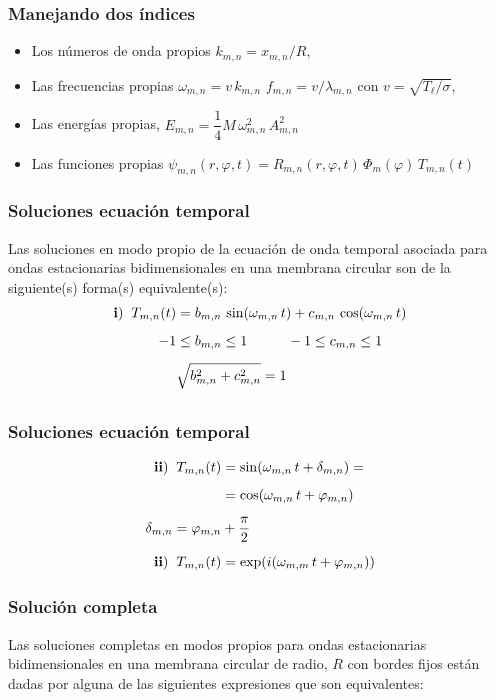 \begin{frame}
\frametitle{Manejando dos índices}
\begin{itemize}[<+->]
\item Los números de onda propios $k_{m, n}= x_{m, n} / R$,
\item Las frecuencias propias $\omega_{m, n}  = v \, k_{m, n}$  $f_{m, n} = v / \lambda_{m, n}$ con $v = \sqrt{T_{\ell} / \sigma}$,
\item  Las energías propias, $E_{m, n} = \dfrac{1}{4} M \, \omega_{m, n}^{2} \, A_{m, n}^{2}$
\item Las funciones propias $\psi_{m, n} (r, \varphi, t) = R_{m,n} (r, \varphi, t) \, \Phi_{m} (\varphi) \, T_{m, n} (t)$
\end{itemize}
\end{frame}
\begin{frame}
\frametitle{Soluciones ecuación temporal}
Las soluciones en modo propio de la ecuación de onda temporal asociada para ondas estacionarias bidimensionales en una membrana circular son de la siguiente(s) forma(s) equivalente(s):
\begin{align*}
\mathbf{i)} \hspace{0.2cm} T_{m,n} (t) &= b_{m,n} \, \sin (\omega_{m,n} \, t) + c_{m,n} \, \cos (\omega_{m,n} \, t) \\[0.5em]
-1 &\leq b_{m,n} \leq 1 \hspace{1cm} -1 \leq c_{m,n} \leq 1 \\[0.5em]
&\sqrt{b_{m,n}^{2} + c_{m,n}^{2}} = 1 \\[0.5em]
\end{align*}
\end{frame}
\begin{frame}
\frametitle{Soluciones ecuación temporal}
\begin{align*}
\mathbf{ii)} \hspace{0.2cm} T_{m,n} (t) &= \sin (\omega_{m,n} \, t + \delta_{m,n}) = \\[0.5em]
&= \cos(\omega_{m,n} \, t + \varphi_{m,n}) \\[0.5em]
\delta_{m,n} = \varphi_{m,n} &+ \dfrac{\pi}{2} \\[0.5em]
\mathbf{ii)} \hspace{0.2cm} T_{m,n} (t) &= \exp(i(\omega_{m,m} \, t + \varphi_{m,n}))
\end{align*}
\end{frame}
\begin{frame}
\frametitle{Solución completa}
Las soluciones completas en modos propios para ondas estacionarias bidimensionales en una membrana circular de radio, $R$ con bordes fijos están dadas por alguna de las siguientes expresiones que son equivalentes:
\end{frame}
